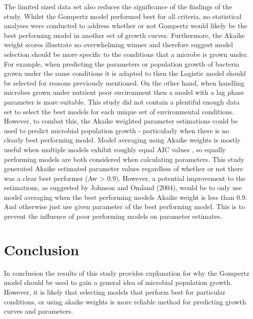\documentclass[11pt]{article}
\begin{document}
The limited sized data set also reduces the significance of the findings of the study. Whilst the Gompertz model performed best for all criteria, no statistical analyses were conducted to address whether or not Gompertz would likely be the best performing model in another set of growth curves. Furthermore, the Akaike weight scores illustrate no overwhelming winner and therefore suggest model selection should be more specific to the conditions that a microbe is grown under. For example, when predicting the parameters or population growth of bacteria grown under the same conditions it is adapted to then the Logistic model should be selected for reasons previously mentioned. On the other hand, when handling microbes grown under nutrient poor environment then a model with a lag phase parameter is more suitable. This study did not contain a plentiful enough data set to select the best models for each unique set of environmental conditions. However, to combat this, the Akaike weighted parameter estimations could be used to predict microbial population growth - particularly when there is no clearly best performing model. Model averaging using Akaike weights is mostly useful when multiple models exhibit roughly equal AIC values \cite{JOHNSON2004101}, so equally performing models are both considered when calculating parameters. This study generated Akaike estimated parameter values regardless of whether or not there was a clear best performer (Aw > 0.9). However, a potential improvement to the estimations, as suggested by Johnson and Omland (2004), would be to only use model averaging when the best performing models Akaike weight is less than 0.9. And otherwise just use given parameter of the best performing model. This is to prevent the influence of poor performing models on parameter estimates.

\section{Conclusion}
In conclusion the results of this study provides explanation for why the Gompertz model should be used to gain a general idea of microbial population growth. However, it is likely that selecting models that perform best for particular conditions, or using akaike weights is more reliable method for predicting growth curves and parameters.



 
  
  
  
\end{document}
